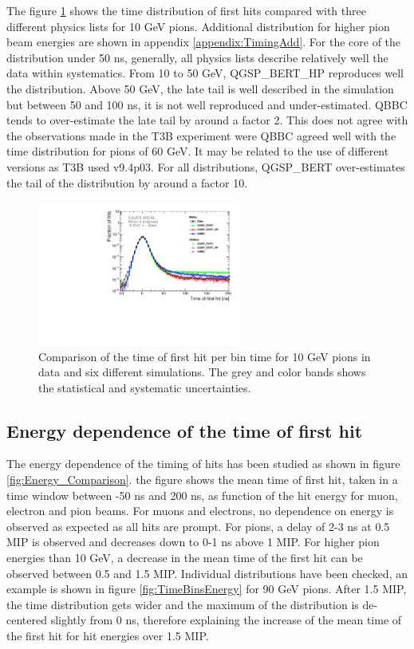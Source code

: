 The figure \ref{fig:dNdt_SimData_10GeV} shows the time distribution of first hits compared with three different physics lists for 10 GeV pions. Additional distribution for higher pion beam energies are shown in appendix \ref{appendix:TimingAdd}. For the core of the distribution under 50 ns, generally, all physics lists describe relatively well the data within systematics. From 10 to 50 GeV, QGSP\_BERT\_HP reproduces well the distribution. Above 50 GeV, the late tail is well described in the simulation but between 50 and 100 ns, it is not well reproduced and under-estimated. QBBC tends to over-estimate the late tail by around a factor 2. This does not agree with the observations made in the T3B experiment were QBBC agreed well with the time distribution for pions of 60 GeV. It may be related to the use of different \geant versions as T3B used \geant v9.4p03. For all distributions, QGSP\_BERT over-estimates the tail of the distribution by around a factor 10.

\begin{figure}[htbp!]
	\centering
	\includegraphics[width=0.6\textwidth]{../Thesis_Plots/Timing/Pions/Plots/Comparison_SimData_Pion10GeV_LateClusters.pdf}
	\caption{Comparison of the time of first hit per bin time for 10 GeV pions in data and six different simulations. The grey and color bands shows the statistical and systematic uncertainties.}
	\label{fig:dNdt_SimData_10GeV}
\end{figure}

\subsection{Energy dependence of the time of first hit}

The energy dependence of the timing of hits has been studied as shown in figure \ref{fig:Energy_Comparison}. the figure shows the mean time of first hit, taken in a time window between -50 ns and 200 ns, as function of the hit energy for muon, electron and pion beams. For muons and electrons, no dependence on energy is observed as expected as all hits are prompt. For pions, a delay of 2-3 ns at 0.5 MIP is observed and decreases down to 0-1 ns above 1 MIP. For higher pion energies than 10 GeV, a decrease in the mean time of the first hit can be observed between 0.5 and 1.5 MIP. Individual distributions have been checked, an example is shown in figure \ref{fig:TimeBinsEnergy} for 90 GeV pions. After 1.5 MIP, the time distribution gets wider and the maximum of the distribution is de-centered slightly from 0 ns, therefore explaining the increase of the mean time of the first hit for hit energies over 1.5 MIP.

